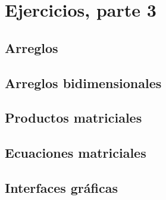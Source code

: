 \section{Ejercicios, parte 3}

\subsection{Arreglos}

\subsection{Arreglos bidimensionales}

\subsection{Productos matriciales}

\subsection{Ecuaciones matriciales}

\subsection{Interfaces gráficas}

